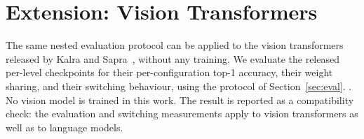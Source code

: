 \section{Extension: Vision Transformers}
\label{sec:extension}


The same nested evaluation protocol can be applied to the vision transformers released by Kalra and Sapra~\cite{kalra2025elastoformer}, without any training. We evaluate the released per-level checkpoints for their per-configuration top-1 accuracy, their weight sharing, and their switching behaviour, using the protocol of Section~\ref{sec:eval}. . No vision model is trained in this work. The result is reported as a compatibility check: the evaluation and switching measurements apply to vision transformers as well as to language models.
